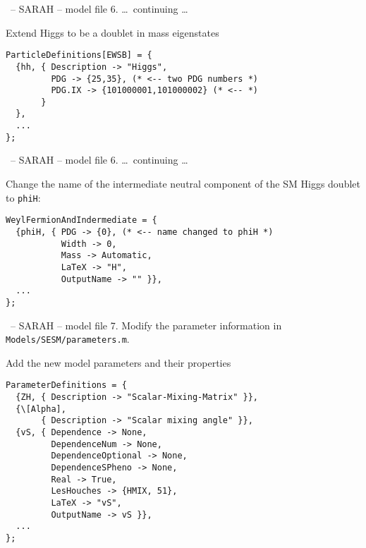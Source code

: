 \documentclass[11pt]{beamer}
\begin{document}

\begin{frame}[fragile]{\insertsection\ -- SARAH -- model file}
  6. \ldots\ continuing \ldots

  \bigskip

  Extend Higgs to be a doublet in mass eigenstates
  \begin{lstlisting}
ParticleDefinitions[EWSB] = {
  {hh, { Description -> "Higgs",
         PDG -> {25,35}, (* <-- two PDG numbers *)
         PDG.IX -> {101000001,101000002} (* <-- *)
       }
  },
  ...
};\end{lstlisting}
\end{frame}


\begin{frame}[fragile]{\insertsection\ -- SARAH -- model file}
  6. \ldots\ continuing \ldots

  \bigskip

  Change the name of the intermediate neutral component of the SM
  Higgs doublet to \texttt{phiH}:
  \begin{lstlisting}
WeylFermionAndIndermediate = {
  {phiH, { PDG -> {0}, (* <-- name changed to phiH *)
           Width -> 0,
           Mass -> Automatic,
           LaTeX -> "H",
           OutputName -> "" }},
  ...
};\end{lstlisting}
\end{frame}


\begin{frame}[fragile]{\insertsection\ -- SARAH -- model file}
  7. Modify the parameter information in
  \texttt{Models/SESM/parameters.m}.

  \bigskip

  Add the new model parameters and their properties
  \begin{lstlisting}
ParameterDefinitions = {
  {ZH, { Description -> "Scalar-Mixing-Matrix" }},
  {\[Alpha],
       { Description -> "Scalar mixing angle" }},
  {vS, { Dependence -> None,
         DependenceNum -> None,
         DependenceOptional -> None,
         DependenceSPheno -> None,
         Real -> True,
         LesHouches -> {HMIX, 51},
         LaTeX -> "vS",
         OutputName -> vS }},
  ...
};\end{lstlisting}
\end{frame}
\end{document}
